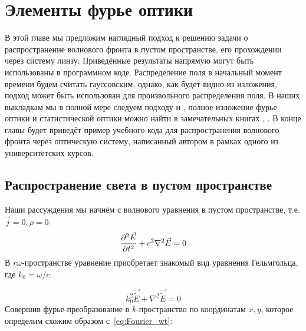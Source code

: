 \chapter{Элементы фурье оптики}
В этой главе мы предложим наглядный подход к решению задачи о распространение волнового фронта в пустом пространстве, его прохождении через систему линзу. Приведённые результаты напрямую могут быть использованы в программном коде. Распределение поля в начальный момент времени будем считать гауссовским, однако, как будет видно из изложения, подход может быть использован для произвольного распределения поля. В наших выкладкам мы в полной мере следуем подходу \cite{serkez2013grating} и \cite{serkez2015design}, полное изложение фурье оптики и статистической оптики можно найти в замечательных книгах \cite{goodman2015statistical}, \cite{goodman2005introduction}. В конце главы будет приведёт пример учебного кода \cite{my_github} для распространения волнового фронта через оптическую систему, написанный автором в рамках одного из университетских курсов.

\section{Распространение света в пустом пространстве}
Наши рассуждения мы начнём с волнового уравнения в пустом пространстве, т.е. $\vec{j} = 0, \rho = 0$. 
\begin{equation}
\pdv[2]{\vec{E}}{t} + c^2 \nabla^2 \vec{E} = 0
\end{equation}
В  $r\omega$-пространстве уравнение приобретает знакомый вид уравнения Гельмгольца, где $k_0 = \omega/c$.

\begin{equation}
k_0^2\vec{\widetilde{E}} + \nabla^2 \vec{\widetilde{E}} = 0
\end{equation}
Совершив фурье-преобразование в $k$-пространство по координатам $x,y$, которое определим схожим образом с~\ref{eq:Fourier_wt}:

